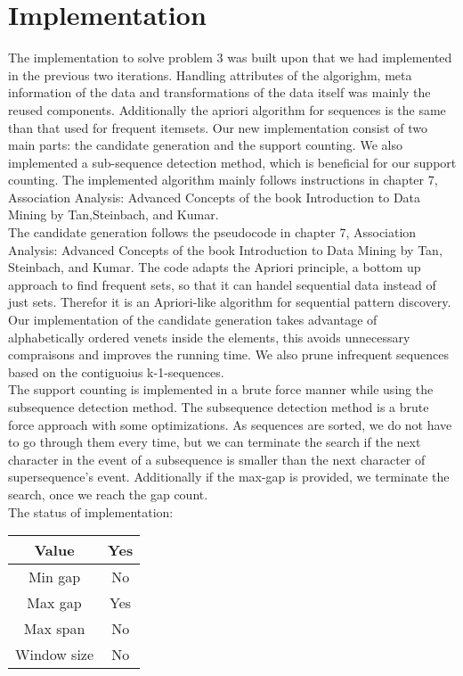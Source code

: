 \section{Implementation}
The implementation to solve problem 3 was built upon that we had implemented in the previous two iterations. Handling attributes of the algorighm, meta information of the data and transformations of the data itself was mainly the reused components. Additionally the apriori algorithm for sequences is the same than that used for frequent itemsets. Our new implementation consist of two main parts: the candidate generation and the support counting. We also implemented a sub-sequence detection method, which is beneficial for our support counting. The implemented algorithm mainly follows instructions in chapter 7, Association Analysis: Advanced Concepts of the book Introduction to Data Mining by Tan,Steinbach, and Kumar.\\ 

The candidate generation follows the pseudocode in chapter 7, Association Analysis: Advanced Concepts of the book Introduction to Data Mining by Tan, Steinbach, and Kumar. The code adapts the Apriori principle, a bottom up approach to find frequent sets, so that it  can handel sequential data instead of just sets. Therefor it is an Apriori-like algorithm for sequential pattern discovery.\\
Our implementation of the candidate generation takes advantage of alphabetically ordered venets inside the elements, this avoids unnecessary compraisons and  improves the running time. We also prune infrequent sequences based on the contiguoius {k-1}-sequences.\\

The support counting is implemented in a brute force manner while using the subsequence detection method. The subsequence detection method is a brute force approach with some optimizations. As sequences are sorted, we do not have to go through them every time, but we can terminate the search if the next character in the event of a subsequence is smaller than the next character of supersequence’s event. Additionally if the max-gap is provided, we terminate the search, once we reach the gap count.\\

The status of implementation:\\
\begin{center}
\begin{tabular}{|c|c|}
\hline Value&Yes\\
\hline Min gap&No\\
\hline Max gap&Yes\\
\hline Max span&No\\
\hline Window size&No\\
\hline
\end{tabular}
\end{center}

